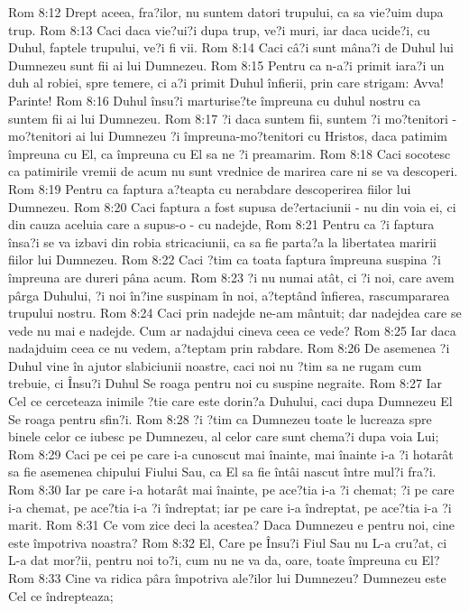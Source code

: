 Rom 8:12  Drept aceea, fra?ilor, nu suntem datori trupului, ca sa vie?uim dupa trup.
Rom 8:13  Caci daca vie?ui?i dupa trup, ve?i muri, iar daca ucide?i, cu Duhul, faptele trupului, ve?i fi vii.
Rom 8:14  Caci câ?i sunt mâna?i de Duhul lui Dumnezeu sunt fii ai lui Dumnezeu.
Rom 8:15  Pentru ca n-a?i primit iara?i un duh al robiei, spre temere, ci a?i primit Duhul înfierii, prin care strigam: Avva! Parinte!
Rom 8:16  Duhul însu?i marturise?te împreuna cu duhul nostru ca suntem fii ai lui Dumnezeu.
Rom 8:17  ?i daca suntem fii, suntem ?i mo?tenitori - mo?tenitori ai lui Dumnezeu ?i împreuna-mo?tenitori cu Hristos, daca patimim împreuna cu El, ca împreuna cu El sa ne ?i preamarim.
Rom 8:18  Caci socotesc ca patimirile vremii de acum nu sunt vrednice de marirea care ni se va descoperi.
Rom 8:19  Pentru ca faptura a?teapta cu nerabdare descoperirea fiilor lui Dumnezeu.
Rom 8:20  Caci faptura a fost supusa de?ertaciunii - nu din voia ei, ci din cauza aceluia care a supus-o - cu nadejde,
Rom 8:21  Pentru ca ?i faptura însa?i se va izbavi din robia stricaciunii, ca sa fie parta?a la libertatea maririi fiilor lui Dumnezeu.
Rom 8:22  Caci ?tim ca toata faptura împreuna suspina ?i împreuna are dureri pâna acum.
Rom 8:23  ?i nu numai atât, ci ?i noi, care avem pârga Duhului, ?i noi în?ine suspinam în noi, a?teptând înfierea, rascumpararea trupului nostru.
Rom 8:24  Caci prin nadejde ne-am mântuit; dar nadejdea care se vede nu mai e nadejde. Cum ar nadajdui cineva ceea ce vede?
Rom 8:25  Iar daca nadajduim ceea ce nu vedem, a?teptam prin rabdare.
Rom 8:26  De asemenea ?i Duhul vine în ajutor slabiciunii noastre, caci noi nu ?tim sa ne rugam cum trebuie, ci Însu?i Duhul Se roaga pentru noi cu suspine negraite.
Rom 8:27  Iar Cel ce cerceteaza inimile ?tie care este dorin?a Duhului, caci dupa Dumnezeu El Se roaga pentru sfin?i.
Rom 8:28  ?i ?tim ca Dumnezeu toate le lucreaza spre binele celor ce iubesc pe Dumnezeu, al celor care sunt chema?i dupa voia Lui;
Rom 8:29  Caci pe cei pe care i-a cunoscut mai înainte, mai înainte i-a ?i hotarât sa fie asemenea chipului Fiului Sau, ca El sa fie întâi nascut între mul?i fra?i.
Rom 8:30  Iar pe care i-a hotarât mai înainte, pe ace?tia i-a ?i chemat; ?i pe care i-a chemat, pe ace?tia i-a ?i îndreptat; iar pe care i-a îndreptat, pe ace?tia i-a ?i marit.
Rom 8:31  Ce vom zice deci la acestea? Daca Dumnezeu e pentru noi, cine este împotriva noastra?
Rom 8:32  El, Care pe Însu?i Fiul Sau nu L-a cru?at, ci L-a dat mor?ii, pentru noi to?i, cum nu ne va da, oare, toate împreuna cu El?
Rom 8:33  Cine va ridica pâra împotriva ale?ilor lui Dumnezeu? Dumnezeu este Cel ce îndrepteaza;
